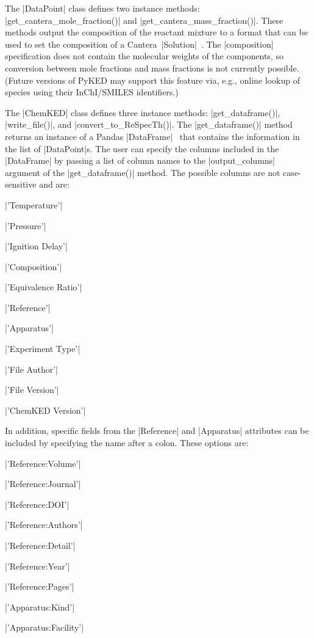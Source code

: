 \documentclass[12pt]{ijck}
\newcommand\pk{PyKED}
\begin{document}
The \pybox|DataPoint| class defines two instance methods:
\pybox|get_cantera_mole_fraction()| and \pybox|get_cantera_mass_fraction()|.
These methods output the composition of the reactant mixture to a
format that can be used to set the composition of a
Cantera~\pybox|Solution|~\autocite{Cantera:2.3.0}.
The \pybox|composition| specification does not contain the molecular
weights of the components, so conversion between mole fractions and mass
fractions is not currently possible. (Future versions of \pk{} may support this
feature via, e.g., online lookup of species using their InChI\slash SMILES
identifiers.)

The \pybox|ChemKED| class defines three instance methods:
\pybox|get_dataframe()|, \pybox|write_file()|, and \pybox|convert_to_ReSpecTh()|.
The \pybox|get_dataframe()| method returns an instance of a
Pandas \pybox|DataFrame|~\autocite{pandas} that contains the information in the
list of \pybox|DataPoint|s. The user can specify the columns included in the
\pybox|DataFrame| by passing a list of column names to the
\pybox|output_columns| argument of the \pybox|get_dataframe()| method. The
possible columns are not case-sensitive and are:
%
\noindent\begin{itemize*}
    \item \pybox|'Temperature'|
    \item \pybox|'Pressure'|
    \item \pybox|'Ignition Delay'|
    \item \pybox|'Composition'|
    \item \pybox|'Equivalence Ratio'|
    \item \pybox|'Reference'|
    \item \pybox|'Apparatus'|
    \item \pybox|'Experiment Type'|
    \item \pybox|'File Author'|
    \item \pybox|'File Version'|
    \item \pybox|'ChemKED Version'|
\end{itemize*}

In addition, specific fields from the \pybox|Reference| and \pybox|Apparatus|
attributes can be included by specifying the name after a colon. These options
are:
%
\noindent\begin{itemize*}
    \item \pybox|'Reference:Volume'|
    \item \pybox|'Reference:Journal'|
    \item \pybox|'Reference:DOI'|
    \item \pybox|'Reference:Authors'|
    \item \pybox|'Reference:Detail'|
    \item \pybox|'Reference:Year'|
    \item \pybox|'Reference:Pages'|
    \item \pybox|'Apparatus:Kind'|
    \item \pybox|'Apparatus:Facility'|
\end{itemize*}
\end{document}
